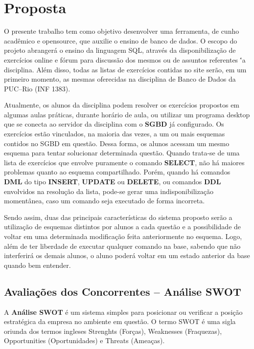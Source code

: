 \documentclass[graduacao,brazil]{ThesisPUC}
\begin{document}
\chapter{Proposta}

O presente trabalho tem como objetivo desenvolver uma ferramenta, de cunho acad\^{e}mico
e opensource, que auxilie o ensino de banco de dados. O escopo do projeto abranger\'{a} o ensino
da linguagem SQL, atrav\'{e}s da disponibiliza\c{c}\~{a}o de exerc\'{i}cios online e f\'{o}rum para discuss\~{a}o dos
mesmos ou de assuntos referentes \''{a} disciplina. Al\'{e}m disso, todas as listas de exerc\'{i}cios contidas
no site ser\~{a}o, em um primeiro momento, as mesmas oferecidas na disciplina de Banco de Dados
da PUC--Rio (INF 1383).

Atualmente, os alunos da disciplina podem resolver os exerc\'{i}cios propostos em algumas
aulas pr\'{a}ticas, durante hor\'{a}rio de aula, ou utilizar um programa desktop que se conecta ao
servidor da disciplina com o \textbf{SGBD} j\'{a} configurado. Os exerc\'{i}cios est\~{a}o vinculados, na maioria das
vezes, a um ou mais esquemas contidos no SGBD em quest\~{a}o. Dessa forma, os alunos acessam
um mesmo esquema para tentar solucionar determinada quest\~{a}o. Quando trata-se de uma lista de
exerc\'{i}cios que envolve puramente o comando \textbf{SELECT}, n\~{a}o h\'{a} maiores problemas quanto ao
esquema compartilhado. Por\'{e}m, quando h\'{a} comandos \textbf{DML} do tipo \textbf{INSERT}, \textbf{UPDATE} ou
\textbf{DELETE}, ou comandos \textbf{DDL} envolvidos na resolu\c{c}\~{a}o da lista, pode-se gerar uma
indisponibiliza\c{c}\~{a}o moment\^{a}nea, caso um comando seja executado de forma incorreta.

Sendo assim, duas das principais caracter\'{i}sticas do sistema proposto ser\~{a}o a utiliza\c{c}\~{a}o de
esquemas distintos por alunos a cada quest\~{a}o e a possibilidade de voltar em uma determinada
modifica\c{c}\~{a}o feita anteriormente no esquema. Logo, al\'{e}m de ter liberdade de executar qualquer
comando na base, sabendo que n\~{a}o interferir\'{a} os demais alunos, o aluno poder\'{a} voltar em um
estado anterior da base quando bem entender.

\section{Avalia\c{c}\~{o}es dos Concorrentes -- An\'{a}lise SWOT}

A \textbf{An\'{a}lise SWOT} \'{e} um sistema simples para posicionar ou verificar a posi\c{c}\~{a}o estrat\'{e}gica
da empresa no ambiente em quest\~{a}o. O termo SWOT \'{e} uma sigla oriunda dos termos ingleses
Strenghts (Forças), Weaknesses (Fraquezas), Opportunities (Oportunidades) e Threats (Ameaças).
\end{document}
